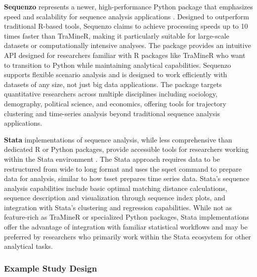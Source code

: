\documentclass[../main.tex]{subfiles}
\begin{document}
\textbf{Sequenzo} represents a newer, high-performance Python package that emphasizes speed and scalability for sequence analysis applications \parencite{sequenzo_github}. Designed to outperform traditional R-based tools, Sequenzo claims to achieve processing speeds up to 10 times faster than TraMineR, making it particularly suitable for large-scale datasets or computationally intensive analyses. The package provides an intuitive API designed for researchers familiar with R packages like TraMineR who want to transition to Python while maintaining analytical capabilities. Sequenzo supports flexible scenario analysis and is designed to work efficiently with datasets of any size, not just big data applications. The package targets quantitative researchers across multiple disciplines including sociology, demography, political science, and economics, offering tools for trajectory clustering and time-series analysis beyond traditional sequence analysis applications.


\textbf{Stata} implementations of sequence analysis, while less comprehensive than dedicated R or Python packages, provide accessible tools for researchers working within the Stata environment \parencite{stata_sequence_analysis, stata_sequence_german}. The Stata approach requires data to be restructured from wide to long format and uses the sqset command to prepare data for analysis, similar to how tsset prepares time series data. Stata's sequence analysis capabilities include basic optimal matching distance calculations, sequence description and visualization through sequence index plots, and integration with Stata's clustering and regression capabilities. While not as feature-rich as TraMineR or specialized Python packages, Stata implementations offer the advantage of integration with familiar statistical workflows and may be preferred by researchers who primarily work within the Stata ecosystem for other analytical tasks.

\subsubsection{Example Study Design}

\end{document}
